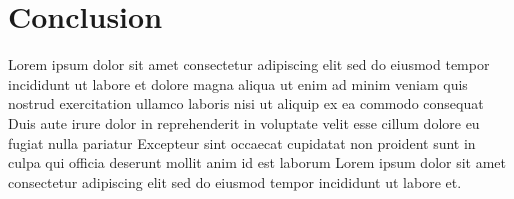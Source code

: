 \section{Conclusion}

Lorem ipsum dolor sit amet consectetur adipiscing elit sed do eiusmod tempor incididunt ut labore et dolore magna aliqua ut enim ad minim veniam quis nostrud exercitation ullamco laboris nisi ut aliquip ex ea commodo consequat Duis aute irure dolor in reprehenderit in voluptate velit esse cillum dolore eu fugiat nulla pariatur Excepteur sint occaecat cupidatat non proident sunt in culpa qui officia deserunt mollit anim id est laborum Lorem ipsum dolor sit amet consectetur adipiscing elit sed do eiusmod tempor incididunt ut labore et.

